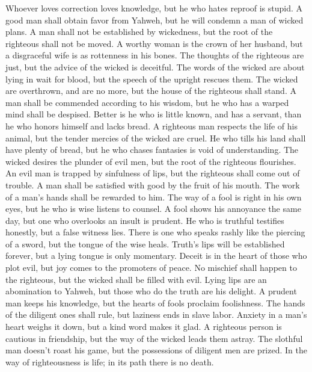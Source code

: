  Whoever loves correction loves knowledge, but he who
hates reproof is stupid.  A good man shall obtain favor
from Yahweh, but he will condemn a man of wicked plans.  A
man shall not be established by wickedness, but the root of the
righteous shall not be moved.  A worthy woman is the crown
of her husband, but a disgraceful wife is as rottenness in his bones.
 The thoughts of the righteous are just, but the advice of
the wicked is deceitful.  The words of the wicked are
about lying in wait for blood, but the speech of the upright rescues
them.  The wicked are overthrown, and are no more, but the
house of the righteous shall stand.  A man shall be
commended according to his wisdom, but he who has a warped mind shall be
despised.  Better is he who is little known, and has a
servant, than he who honors himself and lacks bread.  A
righteous man respects the life of his animal, but the tender mercies of
the wicked are cruel.  He who tills his land shall have
plenty of bread, but he who chases fantasies is void of understanding.
 The wicked desires the plunder of evil men, but the root
of the righteous flourishes.  An evil man is trapped by
sinfulness of lips, but the righteous shall come out of trouble.
 A man shall be satisfied with good by the fruit of his
mouth. The work of a man's hands shall be rewarded to him.
 The way of a fool is right in his own eyes, but he who
is wise listens to counsel.  A fool shows his annoyance
the same day, but one who overlooks an insult is prudent.
 He who is truthful testifies honestly, but a false
witness lies.  There is one who speaks rashly like the
piercing of a sword, but the tongue of the wise heals. 
Truth's lips will be established forever, but a lying tongue is only
momentary.  Deceit is in the heart of those who plot
evil, but joy comes to the promoters of peace.  No
mischief shall happen to the righteous, but the wicked shall be filled
with evil.  Lying lips are an abomination to Yahweh, but
those who do the truth are his delight.  A prudent man
keeps his knowledge, but the hearts of fools proclaim foolishness.
 The hands of the diligent ones shall rule, but laziness
ends in slave labor.  Anxiety in a man's heart weighs it
down, but a kind word makes it glad.  A righteous person
is cautious in friendship, but the way of the wicked leads them astray.
 The slothful man doesn't roast his game, but the
possessions of diligent men are prized.  In the way of
righteousness is life; in its path there is no death.

